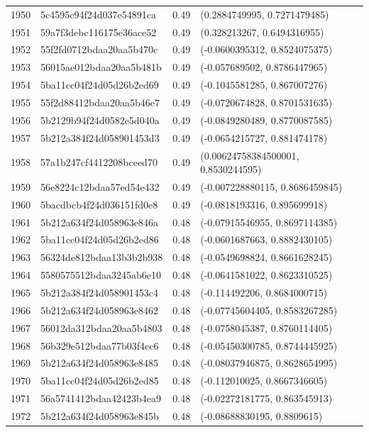 \begin{table}[ht]
\begin{tabular}{rlrl}
  1950 & 5c4595c94f24d037e54891ca & 0.49 & (0.2884749995, 0.7271479485) \\ 
  1951 & 59a7f3debc116175e36ace52 & 0.49 & (0.328213267, 0.6494316955) \\ 
  1952 & 55f2fd0712bdaa20aa5b470c & 0.49 & (-0.0600395312, 0.8524075375) \\ 
  1953 & 56015ae012bdaa20aa5b481b & 0.49 & (-0.057689502, 0.8786447965) \\ 
  1954 & 5ba11cc04f24d05d26b2ed69 & 0.49 & (-0.1045581285, 0.867007276) \\ 
  1955 & 55f2d88412bdaa20aa5b46e7 & 0.49 & (-0.0720674828, 0.8701531635) \\ 
  1956 & 5b2129b94f24d0582e5d040a & 0.49 & (-0.0849280489, 0.8770087585) \\ 
  1957 & 5b212a384f24d058901453d3 & 0.49 & (-0.0654215727, 0.881474178) \\ 
  1958 & 57a1b247cf4412208bceed70 & 0.49 & (0.00624758384500001, 0.8530244595) \\ 
  1959 & 56e8224c12bdaa57ed54e432 & 0.49 & (-0.007228880115, 0.8686459845) \\ 
  1960 & 5bacdbcb4f24d036151fd0e8 & 0.49 & (-0.0818193316, 0.895699918) \\ 
  1961 & 5b212a634f24d058963e846a & 0.48 & (-0.07915546955, 0.8697114385) \\ 
  1962 & 5ba11cc04f24d05d26b2ed86 & 0.48 & (-0.0601687663, 0.8882430105) \\ 
  1963 & 56324de812bdaa13b3b2b938 & 0.48 & (-0.0549698824, 0.8661628245) \\ 
  1964 & 5580575512bdaa3245ab6e10 & 0.48 & (-0.0641581022, 0.8623310525) \\ 
  1965 & 5b212a384f24d058901453c4 & 0.48 & (-0.114492206, 0.8684000715) \\ 
  1966 & 5b212a634f24d058963e8462 & 0.48 & (-0.07745604405, 0.8583267285) \\ 
  1967 & 56012da312bdaa20aa5b4803 & 0.48 & (-0.0758045387, 0.8760114405) \\ 
  1968 & 56b329e512bdaa77b03f4ec6 & 0.48 & (-0.05450300785, 0.8744445925) \\ 
  1969 & 5b212a634f24d058963e8485 & 0.48 & (-0.08037946875, 0.8628654995) \\ 
  1970 & 5ba11cc04f24d05d26b2ed85 & 0.48 & (-0.112010025, 0.8667346605) \\ 
  1971 & 56a5741412bdaa42423b4ea9 & 0.48 & (-0.02272181775, 0.863545913) \\ 
  1972 & 5b212a634f24d058963e845b & 0.48 & (-0.08688830195, 0.8809615) \\ 

\end{tabular}
\end{table}
